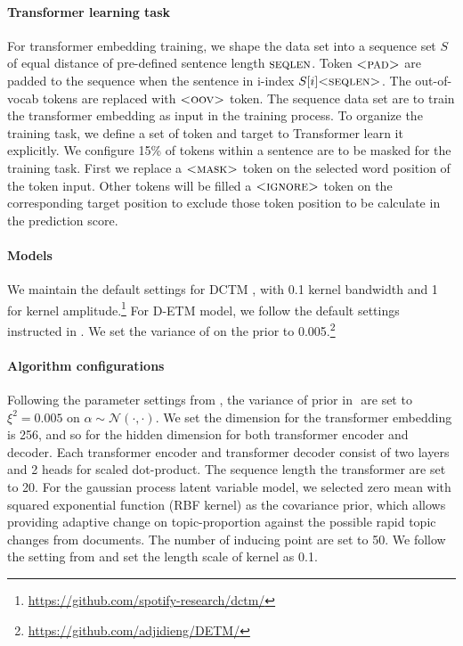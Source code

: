 \paragraph{Transformer learning task}
For transformer embedding training, we shape the data set into a sequence set $ S $ of equal distance of pre-defined sentence length $ \textsc{seqlen} $. Token $ \textsc{<pad>} $ are padded to the sequence when the sentence in i-index $ S[i]\textsc{<seqlen>} $. The out-of-vocab tokens are replaced with $ \textsc{<oov>} $ token. The sequence data set are to train the transformer embedding as input in the training process. To organize the training task, we define a set of token and target to Transformer learn it explicitly. We configure 15\% of tokens within a sentence are to be masked for the training task. First we replace a $ \textsc{<mask>} $ token on the selected word position of the token input. Other tokens will be filled a $ \textsc{<ignore>} $ token on the corresponding target position to exclude those token position to be calculate in the prediction score. 
\paragraph{Models}
We maintain the default settings for DCTM \cite{tomasi_stochastic_nodate}, with 0.1 kernel bandwidth and 1 for kernel amplitude.\footnote{\url{https://github.com/spotify-research/dctm/}}
For D-ETM model, we follow the default settings instructed in \cite{dieng_dynamic_2019}. We set the variance of  on the prior to 0.005.\footnote{\url{https://github.com/adjidieng/DETM/}}
\paragraph{Algorithm configurations}
Following the parameter settings from \cite{blei_dynamic_2006}, the variance of prior in $  $ are set to $ \xi^2=0.005 $ on $ \alpha\sim\mathcal{N}(\cdot,\cdot) $.
We set the dimension for the transformer embedding is 256, and so for the hidden dimension for both transformer encoder and decoder. Each transformer encoder and transformer decoder consist of two layers and 2 heads for scaled dot-product. The sequence length the transformer are set to 20.
For the gaussian process latent variable model, we selected zero mean with squared exponential function (RBF kernel) as the covariance prior, which allows providing adaptive change on topic-proportion against the possible rapid topic changes from documents. The number of inducing point are set to 50. We follow the setting from \cite{tomasi_stochastic_nodate} and set the length scale of kernel as 0.1.
